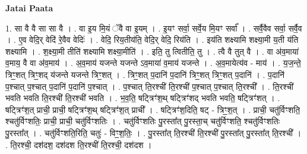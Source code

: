 \documentclass[17pt]{extarticle}
\begin{document}
\textbf{Jatai Paata} \newline

1. सा वै वै सा सा वै । . वा इ॒य मि॒यं ॅवै वा इ॒यम् । . इ॒यꣳ सर्वा॒ सर्वे॒य मि॒यꣳ सर्वा᳚ । . सर्वै॒वैव सर्वा॒ सर्वै॒व । . ए॒व वेदि॒र् वेदि॑ रे॒वैव वेदिः॑ । . वेदि॒ रिय॒तीय॑ति॒ वेदि॒र् वेदि॒ रिय॑ति । . इय॑ति शक्ष्यामि शक्ष्या॒मी य॒ती य॑ति शक्ष्यामि । . श॒क्ष्या॒मी तीति॑ शक्ष्यामि शक्ष्या॒मीति॑ । . इति॒ तु त्वितीति॒ तु । . त्वै वै तुत् वै । . वा अ॑व॒माया॑ व॒माय॒ वै वा अ॑व॒माय॑ । . अ॒व॒माय॑ यजन्ते यजन्ते ऽव॒माया॑ व॒माय॑ यजन्ते । . अ॒व॒मायेत्य॑व - माय॑ । . य॒ज॒न्ते॒ त्रिꣳ॒॒शत् त्रिꣳ॒॒शद् य॑जन्ते यजन्ते त्रिꣳ॒॒शत् । . त्रिꣳ॒॒शत् प॒दानि॑ प॒दानि॑ त्रिꣳ॒॒शत् त्रिꣳ॒॒शत् प॒दानि॑ । . प॒दानि॑ प॒श्चात् प॒श्चात् प॒दानि॑ प॒दानि॑ प॒श्चात् । . प॒श्चात् ति॒रश्ची॑ ति॒रश्ची॑ प॒श्चात् प॒श्चात् ति॒रश्ची᳚ । . ति॒रश्ची॑ भवति भवति ति॒रश्ची॑ ति॒रश्ची॑ भवति । . भ॒व॒ति॒ षट्त्रिꣳ॑श॒थ् षट्त्रिꣳ॑शद् भवति भवति॒ षट्त्रिꣳ॑शत् । . षट्त्रिꣳ॑श॒त् प्राची॒ प्राची॒ षट्त्रिꣳ॑श॒थ् षट्त्रिꣳ॑श॒त् प्राची᳚ । . षट्त्रिꣳ॑श॒दिति॒ षट् - त्रिꣳ॒॒श॒त् । . प्राची॒ चतु॑र्विꣳशति॒ श्चतु॑र्विꣳशतिः॒ प्राची॒ प्राची॒ चतु॑र्विꣳशतिः । . चतु॑र्विꣳशतिः पु॒रस्ता᳚त् पु॒रस्ता॒च् चतु॑र्विꣳशति॒ श्चतु॑र्विꣳशतिः पु॒रस्ता᳚त् । . चतु॑र्विꣳशति॒रिति॒ चतुः॑ - विꣳ॒॒श॒तिः॒ । . पु॒रस्ता᳚त् ति॒रश्ची॑ ति॒रश्ची॑ पु॒रस्ता᳚त् पु॒रस्ता᳚त् ति॒रश्ची᳚ । . ति॒रश्ची॒ दश॑दश॒ दश॑दश ति॒रश्ची॑ ति॒रश्ची॒ दश॑दश । \newline
\end{document}
